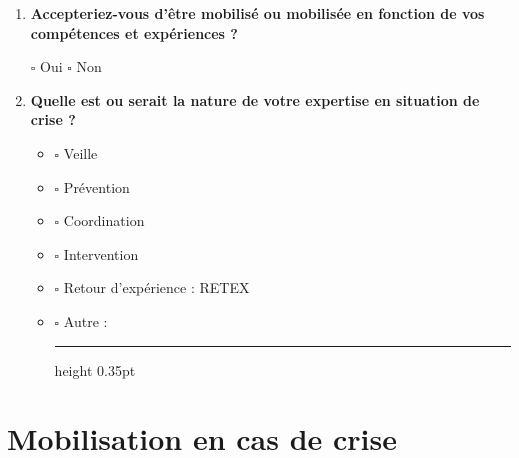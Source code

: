 \documentclass[12pt,a4paper]{article}
\newcommand{\Case}{\(\square\)}
\newcommand{\Ligne}{\leavevmode\leaders\hrule height 0.35pt\hfill\kern0pt}
\newcommand{\Question}[1]{\item \textbf{#1}\par\vspace{0.1em}}
\begin{document}
\begin{enumerate}[label=\textbf{\arabic*.},leftmargin=0pt,itemindent=1.9em,labelwidth=1.4em,labelsep=0.5em,resume]
\Question{Accepteriez-vous d'être mobilisé ou mobilisée en fonction de vos compétences et expériences ?}

\Case{} Oui \hspace{1cm} \Case{} Non

\Question{Quelle est ou serait la nature de votre expertise en situation de crise ?}

\begin{itemize}[leftmargin=1.5cm]
    \item[] \Case{} Veille
    \item[] \Case{} Prévention
    \item[] \Case{} Coordination
    \item[] \Case{} Intervention
    \item[] \Case{} Retour d'expérience : RETEX
    \item[] \Case{} Autre : \Ligne
\end{itemize}

\end{enumerate}

\section{Mobilisation en cas de crise}
\end{document}
